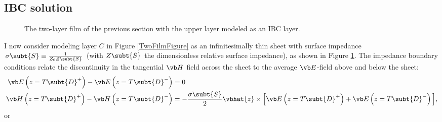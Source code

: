 \documentclass{article}
\begin{document}
\newpage
\subsection{IBC solution}

\begin{figure}[h]
\caption{The two-layer film of the previous section with the 
upper layer modeled as an IBC layer.}
\label{IBCFilmFigure}
\end{figure}
I now consider modeling layer $C$ in Figure \ref{TwoFilmFigure}
as an infinitesimally thin sheet with surface impedance
$\sigma\subt{S}\equiv \frac{1}{Z_0 Z\subt{S}}$
(with $Z\subt{S}$ the dimensionless relative surface impedance),
as shown in Figure \ref{IBCFilmFigure}.
The impedance boundary conditions relate the discontinuity
in the tangential $\vb H$ field across the sheet to the
average $\vb E$-field above and below the sheet:
\begin{align}
\vb E\left(z=T\subt{D}^+\right) - \vb E\left(z=T\subt{D}^-\right)
 &=0
\\
\vb H\left(z=T\subt{D}^+\right) - \vb H\left(z=T\subt{D}^-\right)
 &=-\frac{\sigma\subt{S}}{2}\vbhat{z}\times\Big[
  \vb E\left(z=T\subt{D}^+\right) + \vb E\left(z=T\subt{D}^-\right)\Big],
\end{align}
or 
\end{document}
